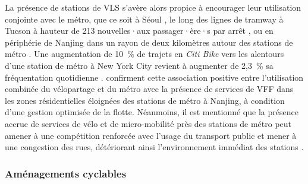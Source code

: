 \begin{refsegment}
La présence de stations de \acrshort{VLS} s'avère alors propice à encourager leur utilisation conjointe avec le métro, que ce soit à Séoul \textcolor{blue}{\autocite[3111]{cho_estimation_2022}}, le long des lignes de tramway à Tucson à hauteur de 213 nouvelles·aux passager·ère·s par arrêt \textcolor{blue}{\autocite[14]{li_investigating_2022}}, ou en périphérie de Nanjing dans un rayon de deux kilomètres autour des stations de métro \textcolor{blue}{\autocite[17]{ji_exploring_2018}}. Une augmentation de 10~\% de trajets en \textsl{Citi Bike} vers les alentours d'une station de métro à New York City revient à augmenter de 2,3~\% sa fréquentation quotidienne \textcolor{blue}{\autocite[932]{ashraf_impacts_2021}}. \textcolor{blue}{\textcite[13]{liu_use_2020}} confirment cette association positive entre l'utilisation combinée du vélopartage et du métro avec la présence de services de \acrshort{VFF} dans les zones résidentielles éloignées des stations de métro à Nanjing, à condition d'une gestion optimisée de la flotte. Néanmoins, il est mentionné que la présence accrue de services de vélo et de micro-mobilité près des stations de métro peut amener à une compétition renforcée avec l'usage du transport public \textcolor{blue}{\autocite[932]{ashraf_impacts_2021}} et mener à une congestion des rues, détériorant ainsi l'environnement immédiat des stations \textcolor{blue}{\autocite[16]{chu_last_2021}}.%

\subsubsection*{Aménagements cyclables
    \label{chap2:amenagements-cyclables}
    }
    

\end{refsegment}
